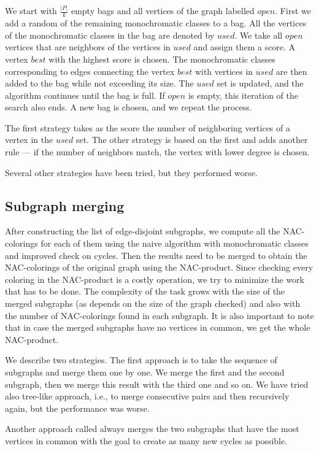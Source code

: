 We start with $\frac{|P|}{k}$ empty bags
and all vertices of the graph labelled $open$.
First we add a random of the remaining monochromatic classes to a bag.
All the vertices of the monochromatic classes in the bag are denoted by $used$.
We take all $open$ vertices that are neighbors of the vertices in $used$ and assign
them a score. A vertex $best$ with the highest score is chosen.
The monochromatic classes corresponding to edges connecting the vertex $best$
with vertices in $used$ are then added to the bag while not exceeding its size.
The $used$ set is updated, and the algorithm continues until the bag is full.
If $open$ is empty, this iteration of the search also ends.
A new bag is chosen, and we repeat the process.

The first strategy \Neighbors{} takes as the score the number of
neighboring vertices of a vertex in the $used$ set.
The other strategy \NeighborsDegree{} is based
on the first and adds another rule ---
if the number of neighbors match, the vertex with lower degree is chosen.

Several other strategies have been tried, but they performed worse.


\subsection{Subgraph merging}%
\label{sec:merging}

After constructing the list of edge-disjoint subgraphs,
we compute all the NAC-colorings for each of them using
the naive algorithm with monochromatic classes
and improved check on cycles.
Then the results need to be merged to obtain the NAC-colorings of the original graph
using the NAC-product.
Since checking every coloring in the NAC-product is a costly operation,
we try to minimize the work that has to be done.
The complexity of the task grows with the size of
the merged subgraphs (as \IsNACColoring{} depends on the size of the graph checked)
and also with the number of NAC-colorings found in each subgraph.
It is also important to note that in case the merged subgraphs
have no vertices in common, we get the whole NAC-product.

We describe two strategies.
The first approach \MergeLinear{} is
to take the sequence of subgraphs and merge them one by one.
We merge the first and the second subgraph, then we merge this result with the
third one and so on. We have tried also tree-like approach, i.e., to merge consecutive pairs
and then recursively again, but the performance was worse.

Another approach called \SharedVertices{} always merges the two subgraphs that
have the most vertices in common with the goal
to create as many new cycles as possible.

